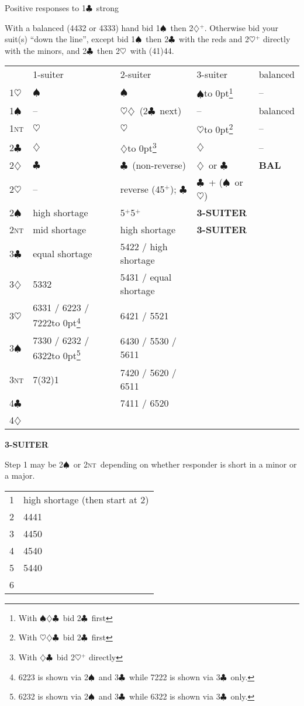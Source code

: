 \documentclass{article}
\renewcommand{\c}{$\clubsuit$}
\renewcommand{\d}{$\diamondsuit$}
\newcommand{\h}{$\heartsuit$}
\newcommand{\s}{$\spadesuit$}
\newcommand{\n}{\textsc{nt}}
\newcommand{\+}{$^+$}
\newcommand{\hsmash}[1]{\hbox to 0pt{#1\hss}}
\begin{document}
\begin{table}[htp]
\centering
\begin{minipage}{\textwidth}
Positive responses to 1\c\ strong

With a balanced (4432 or 4333) hand bid 1\s\ then 2\d\+.  Otherwise bid your suit(s) ``down the line'', except bid 1\s\ then 2\c\ with the reds and 2\h\+ directly with the minors, and 2\c\ then 2\h\ with (41)44.

\smallskip

\begin{tabular}{l|l|l|l|l|}
& 1-suiter & 2-suiter & 3-suiter & balanced \\
1\h & \s & \s & \s\hsmash{\footnote{With \s\d\c\ bid 2\c\ first}} & -- \\
1\s & -- & \h\d\ (2\c\ next) & -- & balanced \\
1\n & \h & \h & \h\hsmash{\footnote{With \h\d\c\ bid 2\c\ first}} & -- \\
2\c & \d & \d\hsmash{\footnote{With \d\c\ bid 2\h\+ directly}} & \d & -- \\
2\d & \c & \c\ (non-reverse) & \d\ or \c & \textbf{BAL} \\
2\h & -- & reverse (45\+); \c & \c\ + (\s\ or \h) & \smash{\vdots} \\
2\s & high shortage & 5\+5\+ & \textbf{3-SUITER} \\
2\n & mid shortage & high shortage & \textbf{3-SUITER} \\
3\c & equal shortage & 5422 / high shortage \\
3\d & 5332 & 5431 / equal shortage \\
3\h & 6331 / 6223 / 7222\hsmash{\footnote{6223 is shown via 2\s\ and 3\c\ while 7222 is shown via 3\c\ only.}} & 6421 / 5521 \\
3\s & 7330 / 6232 / 6322\hsmash{\footnote{6232 is shown via 2\s\ and 3\c\ while 6322 is shown via 3\c\ only.}} & 6430 / 5530 / 5611 \\
3\n & 7(32)1 & 7420 / 5620 / 6511 \\
4\c & \smash{\vdots} & 7411 / 6520 \\
4\d & & \smash{\vdots}
\end{tabular}

\bigskip

\textbf{3-SUITER}

Step 1 may be 2\s\ or 2\n\ depending on whether responder is short in a minor or a major.

\smallskip

\begin{tabular}{l|l}
1&high shortage (then start at 2)\\
2&4441\\
3&4450\\
4&4540\\
5&5440\\
6&\smash{\vdots}
\end{tabular}


\end{minipage}
\end{table}
\end{document}
